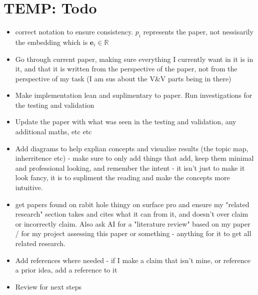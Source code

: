 \documentclass[11pt,a4paper]{article}
\begin{document}



\section*{TEMP: Todo}

\begin{itemize}
    \item correct notation to ensure consistency. $p_i$ represents the paper, not nessisarily the embedding which is $\mathbf{e}_i\in \mathbb{R}$
    \item Go through current paper, making sure everything I currently want in it is in it, and that it is written from the perspective of the paper, not from the perspective of my task (I am sus about the V\&V parts being in there)
    \item Make implementation lean and suplimentary to paper. Run investigations for the testing and validation
    \item Update the paper with what was seen in the testing and validation, any additional maths, etc etc
    \item Add diagrams to help explian concepts and visualise results (the topic map, inherritence etc) - make sure to only add things that add, keep them minimal and professional looking, and remember the intent - it isn't just to make it look fancy, it is to supliment the reading and make the concepts more intuitive.
    \item get papers found on rabit hole thingy on surface pro and ensure my "related research" section takes and cites what it can from it, and doesn't over claim or incorrectly claim. Also ask AI for a "literature review" based on my paper / for my project assessing this paper or something - anything for it to get all related research.
    \item Add references where needed - if I make a claim that isn't mine, or reference a prior idea, add a reference to it
    \item Review for next steps
\end{itemize}
\end{document}

